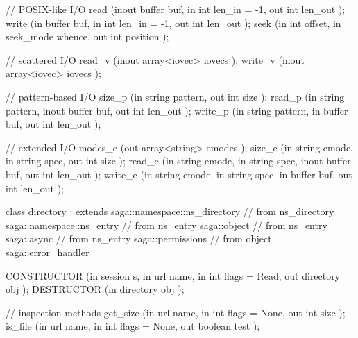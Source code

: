 \begin{myspec}
{{      // POSIX-like I/O
      read        (inout buffer            buf,
                   in    int               len_in = -1,
                   out   int               len_out  );
      write       (in    buffer            buf,
                   in    int               len_in = -1,
                   out   int               len_out  );
      seek        (in    int               offset,
                   in    seek_mode         whence,
                   out   int               position );
 
      // scattered I/O
      read_v      (inout array<iovec>      iovecs  );
      write_v     (inout array<iovec>      iovecs  );
 
      // pattern-based I/O
      size_p      (in    string            pattern,
                   out   int               size     );
      read_p      (in    string            pattern,
                   inout buffer            buf, 
                   out   int               len_out  );
      write_p     (in    string            pattern,
                   in    buffer            buf, 
                   out   int               len_out  );
 
      // extended I/O
      modes_e     (out   array<string>     emodes   );
      size_e      (in    string            emode,
                   in    string            spec,
                   out   int               size     );
      read_e      (in    string            emode,
                   in    string            spec,
                   inout buffer            buf,
                   out   int               len_out  );
      write_e     (in    string            emode,
                   in    string            spec,
                   in    buffer            buf,
                   out   int               len_out  );
    }
 
 
    class directory : extends            saga::namespace::ns_directory
                   // from ns_directory  saga::namespace::ns_entry
                   // from ns_entry      saga::object
                   // from ns_entry      saga::async
                   // from ns_entry      saga::permissions
                   // from object        saga::error_handler
    {
      CONSTRUCTOR (in    session           s,
                   in    url               name,
                   in    int               flags = Read,
                   out   directory         obj      );
      DESTRUCTOR  (in    directory         obj      );
 
      // inspection methods
      get_size    (in    url               name,
                   in    int               flags = None,
                   out   int               size     );
      is_file     (in    url               name,
                   in    int               flags = None,
                   out   boolean           test     );
 
}}
\end{myspec}
